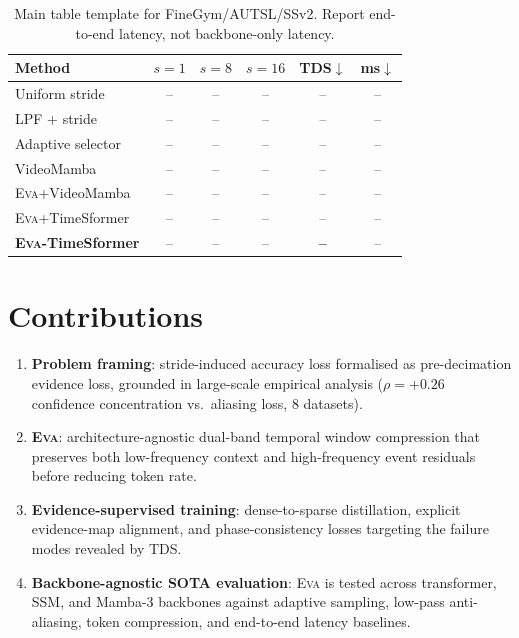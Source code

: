 \documentclass[10pt,twocolumn]{article}
\newcommand{\EVA}{\textsc{Eva}}
\newcommand{\TDS}{\ifmmode\mathrm{TDS}\else\textsc{TDS}\fi}
\begin{document}
\begin{table}[h]
\centering
\small
\caption{Main table template for FineGym/AUTSL/SSv2. Report end-to-end latency,
not backbone-only latency.}
\label{tab:main}
\setlength{\tabcolsep}{3pt}
\begin{tabular}{lccccc}
\toprule
Method & $s{=}1$ & $s{=}8$ & $s{=}16$ & \TDS{}$\downarrow$ & ms$\downarrow$ \\
\midrule
Uniform stride          & -- & -- & -- & -- & -- \\
LPF + stride            & -- & -- & -- & -- & -- \\
Adaptive selector       & -- & -- & -- & -- & -- \\
VideoMamba              & -- & -- & -- & -- & -- \\
\EVA{}+VideoMamba       & -- & -- & -- & -- & -- \\
\EVA{}+TimeSformer      & -- & -- & -- & -- & -- \\
\textbf{\EVA{}-TimeSformer} & -- & -- & -- & \textbf{--} & -- \\
\bottomrule
\end{tabular}
\end{table}

\section{Contributions}
\label{sec:contributions}

\begin{enumerate}
    \item \textbf{Problem framing}: stride-induced accuracy loss formalised as
    pre-decimation evidence loss, grounded in large-scale empirical analysis
    ($\rho{=}{+}0.26$ confidence concentration vs.\ aliasing loss, 8 datasets).
    \item \textbf{\EVA{}}: architecture-agnostic dual-band temporal window
    compression that preserves both low-frequency context and high-frequency
    event residuals before reducing token rate.
    \item \textbf{Evidence-supervised training}: dense-to-sparse distillation,
    explicit evidence-map alignment, and phase-consistency losses targeting the
    failure modes revealed by \TDS{}.
    \item \textbf{Backbone-agnostic SOTA evaluation}: \EVA{} is tested across
    transformer, SSM, and Mamba-3 backbones against adaptive sampling, low-pass
    anti-aliasing, token compression, and end-to-end latency baselines.
\end{enumerate}



\end{document}
